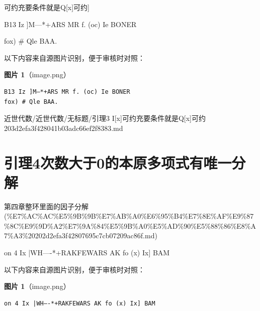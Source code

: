 \begin{lemma}[引理3 I[x]可约充要条件就是Q[x]可约]

B13 Iz ]M—*+ARS MR f. (oc) Ie BONER

fox) \# Qle BAA.

\end{lemma}

\begin{note}
以下内容来自源图片识别，便于审核时对照：

\textbf{图片 1}（image.png）
\begin{Verbatim}[fontsize=\small]
B13 Iz ]M—*+ARS MR f. (oc) Ie BONER
fox) # Qle BAA.
\end{Verbatim}

\end{note}

\begin{note}[来源路径]

近世代数/近世代数/无标题/引理3 I[x]可约充要条件就是Q[x]可约 203d2efa3f428041b03adc66ef2f8383.md

\end{note}

\section*{引理4次数大于0的本原多项式有唯一分解}

\begin{note}[来源上级主题]

第四章整环里面的因子分解 (\%E7\%AC\%AC\%E5\%9B\%9B\%E7\%AB\%A0\%E6\%95\%B4\%E7\%8E\%AF\%E9\%87\%8C\%E9\%9D\%A2\%E7\%9A\%84\%E5\%9B\%A0\%E5\%AD\%90\%E5\%88\%86\%E8\%A7\%A3\%20202d2efa3f42807695c7cb07209ac86f.md)

\end{note}

\begin{lemma}

on 4 Ix |WH—-*+RAKFEWARS AK fo (x) Ix] BAM

\end{lemma}

\begin{note}
以下内容来自源图片识别，便于审核时对照：

\textbf{图片 1}（image.png）
\begin{Verbatim}[fontsize=\small]
on 4 Ix |WH—-*+RAKFEWARS AK fo (x) Ix] BAM
\end{Verbatim}

\end{note}

